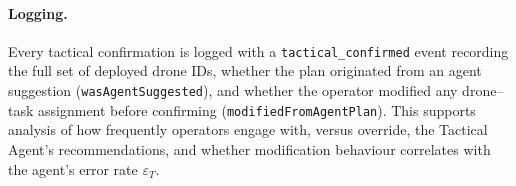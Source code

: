 \paragraph{Logging.}
Every tactical confirmation is logged with a \texttt{tactical\_confirmed} event recording the full set of deployed drone IDs, whether the plan originated from an agent suggestion (\texttt{wasAgentSuggested}), and whether the operator modified any drone--task assignment before confirming (\texttt{modifiedFromAgentPlan}). This supports analysis of how frequently operators engage with, versus override, the Tactical Agent's recommendations, and whether modification behaviour correlates with the agent's error rate $\varepsilon_T$.
